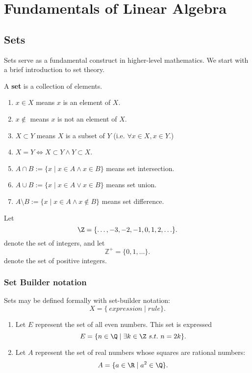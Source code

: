 \documentclass[math0540-lecture-notes.tex]{subfiles}
\begin{document}
\chapter{Fundamentals of Linear Algebra}


\section{Sets}
Sets serve as a fundamental construct in higher-level mathematics. We start with a brief
introduction to set theory.
\begin{definition}[Sets]{}
  A \textbf{set} is a collection of elements.
  \begin{enumerate}
    \item $x \in X$ means $x$ is an element of $X$.
    \item $x \not\in$ means $x$ is not an element of $X$.
    \item $X \subset Y$ means $X$ is a subset of $Y$ (i.e. $\forall x\in X, x\in Y$.)
    \item $X = Y \iff X \subset Y \land Y \subset X$.
    \item $A \cap B := \{x \mid x\in A \land x\in B\}$ means set intersection.
    \item $A \cup B := \{x \mid x\in A \lor x\in B\} $ means set union.
    \item $A \setminus B := \{x \mid x\in A \land x\not\in B\}$ means set difference.
  \end{enumerate}
\end{definition}

\begin{example}
Let \[
  \Z = \{\ldots, -3, -2, -1, 0, 1, 2, \ldots\}
.\] denote the set of integers, and let \[
\mathbb{Z}^+ = \{0, 1, \ldots\} 
.\]  denote the set of positive integers.
\end{example}

\subsection{Set Builder notation}
Sets may be defined formally with set-builder notation: \[
X = \{\ expression \mid rule \} 
.\] 

\begin{example}
  \begin{enumerate}
    \item Let $E$ represent the set of all even numbers. This set is expressed \[
  E = \{n\in \Q\mid \exists k\in \Z~s.t.~n=2k\} 
  .\] 
\item Let $A$ represent the set of real numbers whose squares are rational numbers: \[
A = \{a\in\R\mid a^2\in \Q\} 
.\] 
  \end{enumerate}
\end{example}
\end{document}
